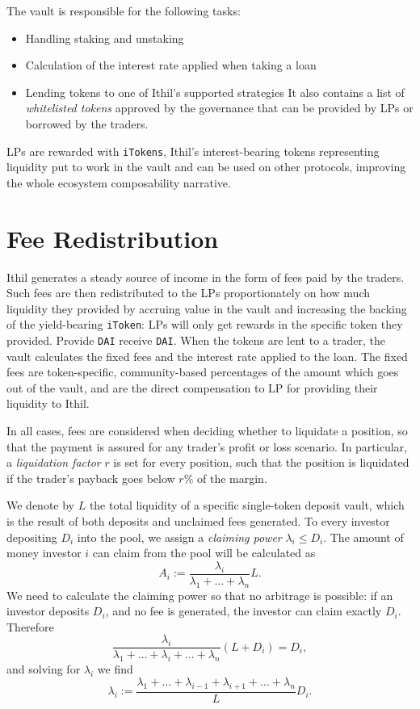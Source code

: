 \documentclass[a4paper,10 pt]{article}
\theoremstyle{definition}
\begin{document}
The vault is responsible for the following tasks:
\begin{itemize}
\item Handling staking and unstaking
\item Calculation of the interest rate applied when taking a loan
\item Lending tokens to one of Ithil’s supported strategies
It also contains a list of {\it whitelisted tokens} approved by the governance that can be provided by LPs or borrowed by the traders.
\end{itemize}

LPs are rewarded with \verb|iTokens|, Ithil's interest-bearing tokens representing liquidity put to work in the vault and can be used on other protocols, improving the whole ecosystem composability narrative.

\section{Fee Redistribution}

Ithil generates a steady source of income in the form of fees paid by the traders. Such fees are then redistributed to the LPs proportionately on how much liquidity they provided by accruing value in the vault and increasing the backing of the yield-bearing \verb|iToken|: LPs will only get rewards in the specific token they provided. Provide \verb|DAI| receive \verb|DAI|.
When the tokens are lent to a trader, the vault calculates the fixed fees and the interest rate applied to the loan. The fixed fees are token-specific, community-based percentages of the amount which goes out of the vault, and are the direct compensation to LP for providing their liquidity to Ithil. 

In all cases, fees are considered when deciding whether to liquidate a position, so that the payment is assured for any trader's profit or loss scenario. In particular, a \textit{liquidation factor} $r$ is set for every position, such that the position is liquidated if the trader's payback goes below $r$\% of the margin.

We denote by $L$ the total liquidity of a specific single-token deposit vault, which is the result of both deposits and unclaimed fees generated. To every investor depositing $D_i$ into the pool, we assign a \emph{claiming power} $\lambda_i \le D_i$. The amount of money investor $i$ can claim from the pool will be calculated as $$A_i := \frac{\lambda_i}{\lambda_1+\ldots+\lambda_n}L.$$ We need to calculate the claiming power so that no arbitrage is possible: if an investor deposits $D_i$, and no fee is generated, the investor can claim exactly $D_i$. Therefore
$$ \frac{\lambda_i}{\lambda_1+\ldots+\lambda_i + \ldots +\lambda_n}(L+D_i) = D_i,$$ and solving for $\lambda_i$ we find $$\lambda_i := \frac{\lambda_1 + \ldots + \lambda_{i-1}+\lambda_{i+1}+\ldots+\lambda_n}{L}D_i.$$
\end{document}
